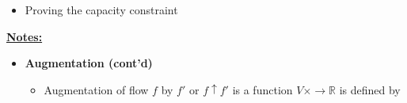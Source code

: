 \documentclass[12pt]{article}
\begin{document}
\begin{enumerate}[1.]
\begin{itemize}
        \begin{enumerate}[1)]
            \item
        \end{enumerate}

        \item Proving the capacity constraint
    \end{itemize}

    \bigskip

    \underline{\textbf{Notes:}}

    \bigskip

    \begin{itemize}
        \item \textbf{Augmentation (cont'd)}

        \begin{itemize}
            \item Augmentation of flow $f$ by $f'$ or $f \uparrow f'$ is a function
            $V \times  \to \mathbb{R}$ is defined by
        \end{itemize}
    \end{itemize}

\end{enumerate}
\end{document}
